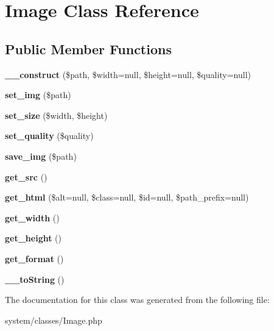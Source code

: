 \hypertarget{class_image}{
\section{Image Class Reference}
\label{class_image}
}
\subsection*{Public Member Functions}
\begin{DoxyCompactItemize}
\item 
\hypertarget{class_image_a36a88991e2f284539109d7cad787c6de}{
{\bfseries \_\-\_\-construct} (\$path, \$width=null, \$height=null, \$quality=null)}
\label{class_image_a36a88991e2f284539109d7cad787c6de}

\item 
\hypertarget{class_image_a724adbbc0d07a3f2eb4668223f483145}{
{\bfseries set\_\-img} (\$path)}
\label{class_image_a724adbbc0d07a3f2eb4668223f483145}

\item 
\hypertarget{class_image_add810e3066708283cc79e394a5251f77}{
{\bfseries set\_\-size} (\$width, \$height)}
\label{class_image_add810e3066708283cc79e394a5251f77}

\item 
\hypertarget{class_image_a5edc605d4b455f2a1ba249affe8eeffe}{
{\bfseries set\_\-quality} (\$quality)}
\label{class_image_a5edc605d4b455f2a1ba249affe8eeffe}

\item 
\hypertarget{class_image_a57a279f70f677542634b1ccdfd46f3b7}{
{\bfseries save\_\-img} (\$path)}
\label{class_image_a57a279f70f677542634b1ccdfd46f3b7}

\item 
\hypertarget{class_image_a9fda97198e4d49b3190e8b7811e4c211}{
{\bfseries get\_\-src} ()}
\label{class_image_a9fda97198e4d49b3190e8b7811e4c211}

\item 
\hypertarget{class_image_ad814374c2027e2e9d0aec0017e3a3c24}{
{\bfseries get\_\-html} (\$alt=null, \$class=null, \$id=null, \$path\_\-prefix=null)}
\label{class_image_ad814374c2027e2e9d0aec0017e3a3c24}

\item 
\hypertarget{class_image_abb10ccd258503d273acaf265bf1b1535}{
{\bfseries get\_\-width} ()}
\label{class_image_abb10ccd258503d273acaf265bf1b1535}

\item 
\hypertarget{class_image_a0acd49b80218568ea04e7a5886373c54}{
{\bfseries get\_\-height} ()}
\label{class_image_a0acd49b80218568ea04e7a5886373c54}

\item 
\hypertarget{class_image_a97b3fc1c33d4dc8fdbf1bfcf7d530f8b}{
{\bfseries get\_\-format} ()}
\label{class_image_a97b3fc1c33d4dc8fdbf1bfcf7d530f8b}

\item 
\hypertarget{class_image_a7516ca30af0db3cdbf9a7739b48ce91d}{
{\bfseries \_\-\_\-toString} ()}
\label{class_image_a7516ca30af0db3cdbf9a7739b48ce91d}

\end{DoxyCompactItemize}


The documentation for this class was generated from the following file:\begin{DoxyCompactItemize}
\item 
system/classes/Image.php\end{DoxyCompactItemize}

